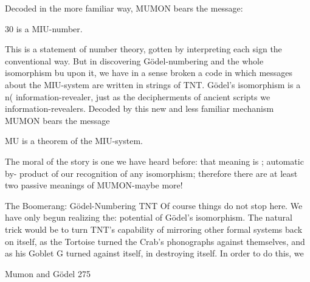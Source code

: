        Decoded in the more familiar way, MUMON bears the message:

                                  30 is a MIU-number.

This is a statement of number theory, gotten by interpreting each sign the conventional
way.
        But in discovering Gödel-numbering and the whole isomorphism bu upon it, we
have in a sense broken a code in which messages about the MIU-system are written in
strings of TNT. Gödel’s isomorphism is a n( information-revealer, just as the
decipherments of ancient scripts we information-revealers. Decoded by this new and less
familiar mechanism MUMON bears the message

                          MU is a theorem of the MIU-system.

The moral of the story is one we have heard before: that meaning is ; automatic by-
product of our recognition of any isomorphism; therefore there are at least two passive
meanings of MUMON-maybe more!

                   The Boomerang: Gödel-Numbering TNT
Of course things do not stop here. We have only begun realizing the: potential of Gödel’s
isomorphism. The natural trick would be to turn TNT's capability of mirroring other
formal systems back on itself, as the Tortoise turned the Crab's phonographs against
themselves, and as his Goblet G turned against itself, in destroying itself. In order to do
this, we



Mumon and Gödel                                                                        275

